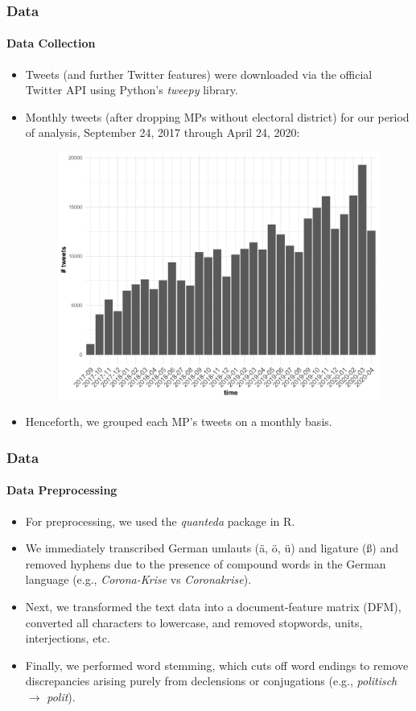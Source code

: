\documentclass[xcolor=dvipsnames]{beamer}
\begin{document}
\begin{frame}
\frametitle{Data}
\framesubtitle{Data Collection}
\begin{itemize}
\item Tweets (and further Twitter features) were downloaded via the official Twitter API using Python's \textit{tweepy} library.
\item Monthly tweets (after dropping MPs without electoral district) for our period of analysis, September 24, 2017 through April 24, 2020:
	\begin{figure}[h!]
  	\centering
  	\includegraphics[scale = 0.30]{../plots/3/monthly_tweets.pdf}
	\end{figure}
\item Henceforth, we grouped each MP's tweets on a monthly basis.
\end{itemize}
\end{frame}

\begin{frame}
\frametitle{Data}
\framesubtitle{Data Preprocessing}
\begin{itemize}
\item For preprocessing, we used the \textit{quanteda} package in R.
\item We immediately transcribed German umlauts (\"a, \"o, \"u) and ligature (\ss) and removed hyphens due to the presence of compound words in the German language (e.g., \textit{Corona-Krise} vs \textit{Coronakrise}).
\item Next, we transformed the text data into a document-feature matrix (DFM), converted all characters to lowercase, and removed stopwords, units, interjections, etc.
\item Finally, we performed word stemming, which cuts off word endings to remove discrepancies arising purely from declensions or conjugations
(e.g., \textit{politisch} $\rightarrow$ \textit{polit}).
\end{itemize}
\end{frame}
\end{document}
